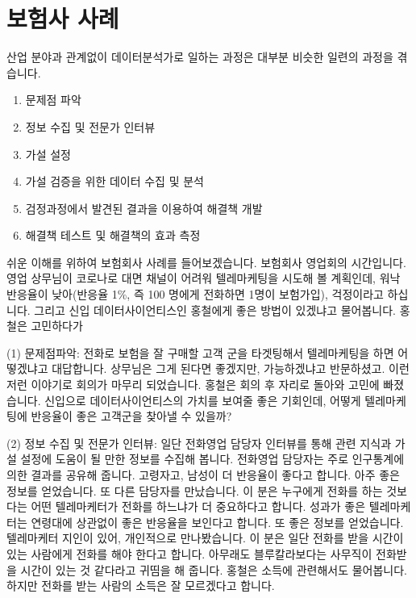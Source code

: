 \documentclass[letterpaper,10pt,english]{jupyterBook}
\begin{document}
\section{보험사 사례}
\label{\detokenize{chapter3/3.1.1_Use_Case:id1}}\label{\detokenize{chapter3/3.1.1_Use_Case::doc}}
\sphinxAtStartPar
산업 분야과 관계없이 데이터분석가로 일하는 과정은 대부분 비슷한 일련의 과정을 겪습니다.
\begin{enumerate}
%
\item {} 
\sphinxAtStartPar
문제점 파악

\item {} 
\sphinxAtStartPar
정보 수집 및 전문가 인터뷰

\item {} 
\sphinxAtStartPar
가설 설정

\item {} 
\sphinxAtStartPar
가설 검증을 위한 데이터 수집 및 분석

\item {} 
\sphinxAtStartPar
검정과정에서 발견된 결과을 이용하여 해결책 개발

\item {} 
\sphinxAtStartPar
해결책 테스트 및 해결책의 효과 측정

\end{enumerate}

\sphinxAtStartPar
쉬운 이해를 위하여 보험회사 사례를 들어보겠습니다. 보험회사 영업회의 시간입니다. 영업 상무님이 코로나로 대면 채널이 어려워 텔레마케팅을 시도해 볼 계획인데, 워낙 반응율이 낮아(반응율 1\%, 즉 100 명에게 전화하면 1명이 보험가입), 걱정이라고 하십니다. 그리고 신입 데이터사이언티스인 홍철에게 좋은 방법이 있겠냐고 물어봅니다. 홍철은 고민하다가

\sphinxAtStartPar
(1) 문제점파악: 전화로 보험을 잘 구매할 고객 군을 타겟팅해서 텔레마케팅을 하면 어떻겠냐고 대답합니다. 상무님은 그게 된다면 좋겠지만, 가능하겠냐고 반문하셨고. 이런 저런 이야기로 회의가 마무리 되었습니다. 홍철은 회의 후 자리로 돌아와 고민에 빠졌습니다. 신입으로 데이터사이언티스의 가치를 보여줄 좋은 기회인데, 어떻게 텔레마케팅에 반응율이 좋은 고객군을 찾아낼 수 있을까?

\sphinxAtStartPar
(2) 정보 수집 및 전문가 인터뷰: 일단 전화영업 담당자 인터뷰를 통해 관련 지식과 가설 설정에 도움이 될 만한 정보를 수집해 봅니다. 전화영업 담당자는 주로 인구통계에 의한 결과를 공유해 줍니다. 고령자고, 남성이 더 반응율이 좋다고 합니다. 아주 좋은 정보를 얻었습니다. 또 다른 담당자를 만났습니다. 이 분은 누구에게 전화를 하는 것보다는 어떤 텔레마케터가 전화를 하느냐가 더 중요하다고 합니다. 성과가 좋은 텔레마케터는 연령대에 상관없이 좋은 반응율을 보인다고 합니다. 또 좋은 정보를 얻었습니다. 텔레마케터 지인이 있어, 개인적으로 만나봤습니다. 이 분은 일단 전화를 받을 시간이 있는 사람에게 전화를 해야 한다고 합니다. 아무래도 블루칼라보다는 사무직이 전화받을 시간이 있는 것 같다라고 귀띰을 해 줍니다. 홍철은 소득에 관련해서도 물어봅니다. 하지만 전화를 받는 사람의 소득은 잘 모르겠다고 합니다.
\end{document}
